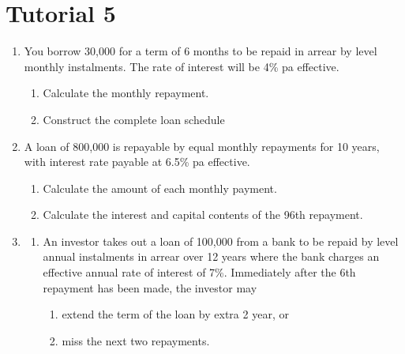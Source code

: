 \documentclass[
]{book}
\theoremstyle{definition}
\theoremstyle{definition}
\theoremstyle{definition}
\theoremstyle{definition}
\theoremstyle{remark}
\begin{document}
\section{Tutorial 5}\label{tutorial-5}

\begin{enumerate}
\def\labelenumi{\arabic{enumi}.}
\item
  You borrow 30,000 for a term of 6 months to be repaid in arrear by
  level monthly instalments. The rate of interest will be 4\% pa
  effective.

  \begin{enumerate}
  \def\labelenumii{\arabic{enumii}.}
  \item
    Calculate the monthly repayment.
  \item
    Construct the complete loan schedule
  \end{enumerate}
\item
  A loan of 800,000 is repayable by equal monthly repayments for 10
  years, with interest rate payable at 6.5\% pa effective.

  \begin{enumerate}
  \def\labelenumii{\arabic{enumii}.}
  \item
    Calculate the amount of each monthly payment.
  \item
    Calculate the interest and capital contents of the 96th
    repayment.
  \end{enumerate}
\item
  \begin{enumerate}
  \def\labelenumii{\arabic{enumii}.}
  \item
    An investor takes out a loan of 100,000 from a bank to be repaid
    by level annual instalments in arrear over 12 years where the
    bank charges an effective annual rate of interest of 7\%.
    Immediately after the 6th repayment has been made, the investor
    may

    \begin{enumerate}
    \def\labelenumiii{\arabic{enumiii}.}
    \item
      extend the term of the loan by extra 2 year, or
    \item
      miss the next two repayments.
    \end{enumerate}


\end{enumerate}
\end{enumerate}
\end{document}
